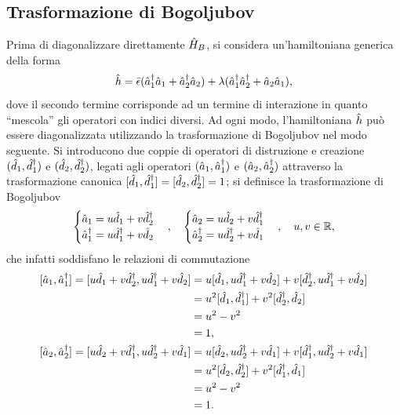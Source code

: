 \subsection{Trasformazione di Bogoljubov}
Prima di diagonalizzare direttamente $\hat{H}_B$, si considera un'hamiltoniana generica della forma
\begin{equation}
\label{eq: hamiltoniana generica h}
    \hat{h} = \bar{\epsilon}(\hat{a}^\dagger_1\hat{a}_1 + \hat{a}^\dagger_2\hat{a}_2) + \lambda(\hat{a}^\dagger_1\hat{a}^\dagger_2 + \hat{a}_2\hat{a}_1),
\end{equation}
dove il secondo termine corrisponde ad un termine di interazione in quanto ``mescola'' gli operatori con indici diversi. Ad ogni modo, l'hamiltoniana $\hat{h}$ può essere diagonalizzata utilizzando la trasformazione di Bogoljubov nel modo seguente. Si introducono due coppie di operatori di distruzione e creazione $(\hat{d}_1, \hat{d}^\dagger_1)$ e $(\hat{d}_2, \hat{d}^\dagger_2)$, legati agli operatori $(\hat{a}_1, \hat{a}^\dagger_1)$ e $(\hat{a}_2, \hat{a}^\dagger_2)$ attraverso la trasformazione canonica $[\hat{d}_1,\hat{d}^\dagger_1] = [\hat{d}_2,\hat{d}^\dagger_2] = 1$; si definisce la trasformazione di Bogoljubov
\begin{equation}
    \begin{cases}
        \hat{a}_1 = u\hat{d}_1 + v\hat{d}^\dagger_2 \\
        \hat{a}^\dagger_1 = u\hat{d}^\dagger_1 + v\hat{d}_2 \\
    \end{cases},\quad 
    \begin{cases}
        \hat{a}_2 = u\hat{d}_2 + v\hat{d}^\dagger_1 \\
        \hat{a}^\dagger_2 = u\hat{d}^\dagger_2 + v\hat{d}_1 \\
    \end{cases},\quad u,v \in \mathbb{R},
\end{equation}
che infatti soddisfano le relazioni di commutazione
\begin{align}
    \begin{split}
        [\hat{a}_1,\hat{a}^\dagger_1] = [u\hat{d}_1 + v\hat{d}^\dagger_2,u\hat{d}^\dagger_1 + v\hat{d}_2] &= u[\hat{d}_1,u\hat{d}^\dagger_1 + v\hat{d}_2] + v[\hat{d}^\dagger_2,u\hat{d}^\dagger_1 + v\hat{d}_2] \\
        &= u^2[\hat{d}_1,\hat{d}^\dagger_1] + v^2[\hat{d}^\dagger_2,\hat{d}_2] \\
        &= u^2 - v^2 \\
        &= 1,
    \end{split} \\
    \begin{split}
        [\hat{a}_2,\hat{a}^\dagger_2] = [u\hat{d}_2 + v\hat{d}^\dagger_1,u\hat{d}^\dagger_2 + v\hat{d}_1] &= u[\hat{d}_2,u\hat{d}^\dagger_2 + v\hat{d}_1] + v[\hat{d}^\dagger_1,u\hat{d}^\dagger_2 + v\hat{d}_1] \\
        &= u^2[\hat{d}_2,\hat{d}^\dagger_2] + v^2[\hat{d}^\dagger_1,\hat{d}_1] \\
        &= u^2 - v^2 \\
        &= 1.
    \end{split}
\end{align}

